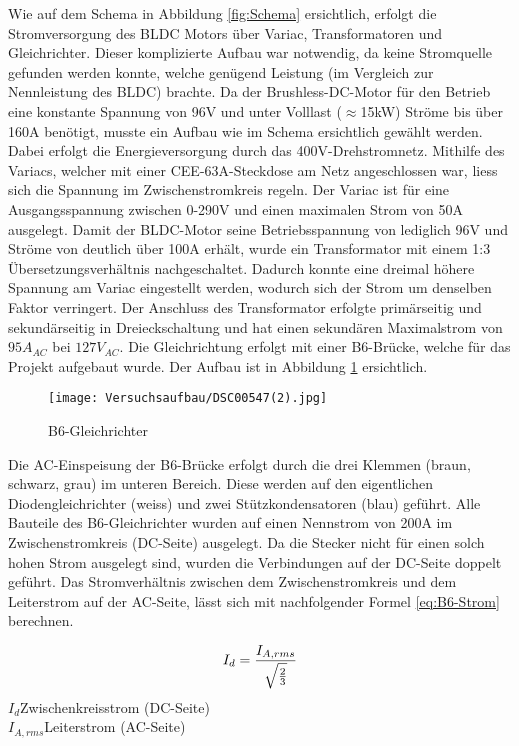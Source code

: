 Wie auf dem Schema in Abbildung \ref{fig:Schema} ersichtlich, erfolgt die Stromversorgung des BLDC Motors über Variac, Transformatoren und Gleichrichter. Dieser \glqq komplizierte \grqq Aufbau war notwendig, da keine Stromquelle gefunden werden konnte, welche genügend Leistung (im Vergleich zur Nennleistung des BLDC) brachte. Da der Brushless-DC-Motor für den Betrieb eine konstante Spannung von 96V und unter Volllast ($\approx$15kW) Ströme bis über 160A benötigt, musste ein Aufbau wie im Schema ersichtlich gewählt werden. Dabei erfolgt die Energieversorgung durch das 400V-Drehstromnetz. Mithilfe des Variacs, welcher mit einer CEE-63A-Steckdose am Netz angeschlossen war, liess sich die Spannung im Zwischenstromkreis regeln. Der Variac ist für eine Ausgangsspannung zwischen 0-290V und einen maximalen Strom von 50A ausgelegt. Damit der BLDC-Motor seine Betriebsspannung von lediglich 96V und Ströme von deutlich über 100A erhält, wurde ein Transformator mit einem 1:3 Übersetzungsverhältnis nachgeschaltet. Dadurch konnte eine dreimal höhere Spannung am Variac eingestellt werden, wodurch sich der Strom um denselben Faktor verringert. Der Anschluss des Transformator erfolgte primärseitig und sekundärseitig in Dreieckschaltung und hat einen sekundären Maximalstrom von $95A_{AC}$ bei $127V_{AC}$. Die Gleichrichtung erfolgt mit einer B6-Brücke, welche für das Projekt aufgebaut wurde. Der Aufbau ist in Abbildung \ref{fig:B6} ersichtlich.

\begin{figure}[H]
	\centering
	\texttt{[image: Versuchsaufbau/DSC00547(2).jpg]}
	\caption[B6-Gleichrichter]{B6-Gleichrichter}
	\label{fig:B6}
\end{figure}

Die AC-Einspeisung der B6-Brücke erfolgt durch die drei Klemmen (braun, schwarz, grau) im unteren Bereich. Diese werden auf den eigentlichen Diodengleichrichter (weiss) und zwei Stützkondensatoren (blau) geführt. Alle Bauteile des B6-Gleichrichter wurden auf einen Nennstrom von 200A im Zwischenstromkreis (DC-Seite) ausgelegt. Da die Stecker nicht für einen solch hohen Strom ausgelegt sind, wurden die Verbindungen auf der DC-Seite doppelt geführt. Das Stromverhältnis zwischen dem Zwischenstromkreis und dem Leiterstrom auf der AC-Seite, lässt sich mit nachfolgender Formel \ref{eq:B6-Strom} berechnen.

\begin{equation}
\centering
I_{d}=\frac{I_{A,rms}}{\sqrt{\frac{2}{3}}}
\label{eq:B6-Strom}
\end{equation}
$ I_{d} $\qquad\quad 	Zwischenkreisstrom (DC-Seite)      \\
$ I_{A,rms} $\quad Leiterstrom (AC-Seite)    \\

